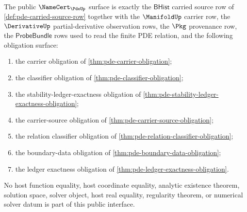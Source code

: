 \begin{theorem}\label{thm:pde-public-interface-export}
The public $\NameCert_{\PdeUp}$ surface is exactly the $\mathsf{BHist}$ carried source row of \autoref{def:pde-carried-source-row} together with the $\ManifoldUp$ carrier row, the $\DerivativeUp$ partial-derivative observation rows, the $\Pkg$ provenance row, the $\mathsf{ProbeBundle}$ rows used to read the finite PDE relation, and the following obligation surface:
\begin{enumerate}
  \item the carrier obligation of \autoref{thm:pde-carrier-obligation};
  \item the classifier obligation of \autoref{thm:pde-classifier-obligation};
  \item the stability-ledger-exactness obligation of \autoref{thm:pde-stability-ledger-exactness-obligation};
  \item the carrier-source obligation of \autoref{thm:pde-carrier-source-obligation};
  \item the relation classifier obligation of \autoref{thm:pde-relation-classifier-obligation};
  \item the boundary-data obligation of \autoref{thm:pde-boundary-data-obligation};
  \item the ledger exactness obligation of \autoref{thm:pde-ledger-exactness-obligation}.
\end{enumerate}
No host function equality, host coordinate equality, analytic existence theorem, solution space, solver object, host real equality, regularity theorem, or numerical solver datum is part of this public interface.
\end{theorem}
